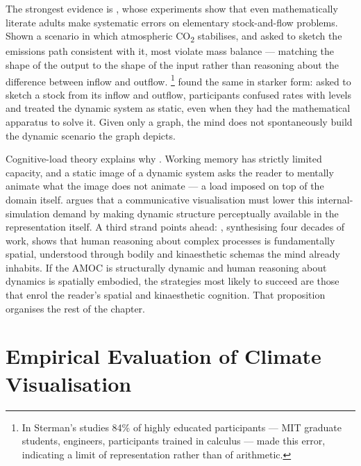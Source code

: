 The strongest evidence is \citet{sterman2008}, whose experiments show that even mathematically literate adults make systematic errors on elementary stock-and-flow problems. Shown a scenario in which atmospheric CO\textsubscript{2} stabilises, and asked to sketch the emissions path consistent with it, most violate mass balance --- matching the shape of the output to the shape of the input rather than reasoning about the difference between inflow and outflow.
\footnote{In Sterman's studies 84\% of highly educated participants --- MIT graduate students, engineers, participants trained in calculus --- made this error, indicating a limit of representation rather than of arithmetic.} \citet{cronin2009} found the same in starker form: asked to sketch a stock from its inflow and outflow, participants confused rates with levels and treated the dynamic system as static, even when they had the mathematical apparatus to solve it. Given only a graph, the mind does not spontaneously build the dynamic scenario the graph depicts.



Cognitive-load theory explains why \citep{sweller1988, swellervanmerrienboer2019}. Working memory has strictly limited capacity, and a static image of a dynamic system asks the reader to mentally animate what the image does not animate --- a load imposed on top of the domain itself. \citet{ware2021} argues that a communicative visualisation must lower this internal-simulation demand by making dynamic structure perceptually available in the representation itself. A third strand points ahead: \citet{tversky2019}, synthesising four decades of work, shows that human reasoning about complex processes is fundamentally spatial, understood through bodily and kinaesthetic schemas the mind already inhabits. If the AMOC is structurally dynamic and human reasoning about dynamics is spatially embodied, the strategies most likely to succeed are those that enrol the reader's spatial and kinaesthetic cognition. That proposition organises the rest of the chapter.

\section{Empirical Evaluation of Climate Visualisation}
\label{sec:empirical-viz}

